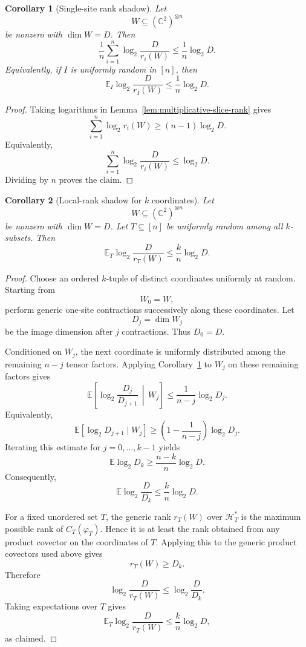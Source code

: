 \documentclass[11pt]{article}
\newtheorem{corollary}{Corollary}
\begin{document}
\begin{corollary}[Single-site rank shadow]
	\label{cor:single-site-shadow}
	Let
	\[
	W\subseteq(\mathbb C^2)^{\otimes n}
	\]
	be nonzero with \(\dim W=D\).  Then
	\[
	\frac1n\sum_{i=1}^n
	\log_2\frac{D}{r_i(W)}
	\leq
	\frac1n\log_2D.
	\]
	Equivalently, if \(I\) is uniformly random in \([n]\), then
	\[
	\mathbb E_I
	\log_2\frac{D}{r_I(W)}
	\leq
	\frac1n\log_2D.
	\]
\end{corollary}

\begin{proof}
	Taking logarithms in Lemma~\ref{lem:multiplicative-slice-rank} gives
	\[
	\sum_{i=1}^n\log_2 r_i(W)
	\geq
	(n-1)\log_2D.
	\]
	Equivalently,
	\[
	\sum_{i=1}^n
	\log_2\frac{D}{r_i(W)}
	\leq
	\log_2D.
	\]
	Dividing by \(n\) proves the claim.
\end{proof}

\begin{corollary}[Local-rank shadow for \(k\) coordinates]
	\label{cor:k-site-shadow}
	Let
	\[
	W\subseteq(\mathbb C^2)^{\otimes n}
	\]
	be nonzero with \(\dim W=D\).  Let \(T\subseteq[n]\) be uniformly random among
	all \(k\)-subsets.  Then
	\[
	\mathbb E_T
	\log_2\frac{D}{r_T(W)}
	\leq
	\frac{k}{n}\log_2D.
	\]
\end{corollary}

\begin{proof}
	Choose an ordered \(k\)-tuple of distinct coordinates uniformly at random.
	Starting from
	\[
	W_0=W,
	\]
	perform generic one-site contractions successively along these coordinates.
	Let
	\[
	D_j=\dim W_j
	\]
	be the image dimension after \(j\) contractions.  Thus \(D_0=D\).
	
	Conditioned on \(W_j\), the next coordinate is uniformly distributed among
	the remaining \(n-j\) tensor factors.  Applying
	Corollary~\ref{cor:single-site-shadow} to \(W_j\) on these remaining factors
	gives
	\[
	\mathbb E
	\left[
	\log_2\frac{D_j}{D_{j+1}}
	\,\middle|\, W_j
	\right]
	\leq
	\frac1{n-j}\log_2D_j.
	\]
	Equivalently,
	\[
	\mathbb E[\log_2D_{j+1}\mid W_j]
	\geq
	\left(1-\frac1{n-j}\right)\log_2D_j.
	\]
	Iterating this estimate for \(j=0,\ldots,k-1\) yields
	\[
	\mathbb E\log_2D_k
	\geq
	\frac{n-k}{n}\log_2D.
	\]
	Consequently,
	\[
	\mathbb E
	\log_2\frac{D}{D_k}
	\leq
	\frac{k}{n}\log_2D.
	\]
	
	For a fixed unordered set \(T\), the generic rank \(r_T(W)\) over
	\(\mathcal H_T^*\) is the maximum possible rank of \(C_T(\varphi_T)\).  Hence
	it is at least the rank obtained from any product covector on the coordinates
	of \(T\).  Applying this to the generic product covectors used above gives
	\[
	r_T(W)\geq D_k.
	\]
	Therefore
	\[
	\log_2\frac{D}{r_T(W)}
	\leq
	\log_2\frac{D}{D_k}.
	\]
	Taking expectations over \(T\) gives
	\[
	\mathbb E_T
	\log_2\frac{D}{r_T(W)}
	\leq
	\frac{k}{n}\log_2D,
	\]
	as claimed.
\end{proof}
\end{document}
